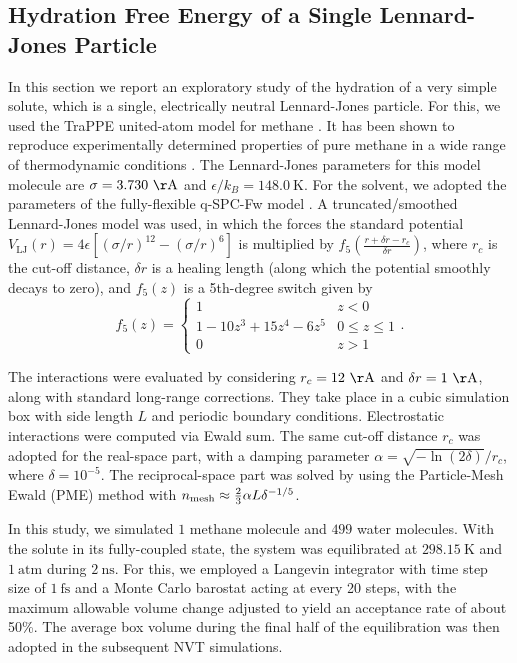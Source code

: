 \documentclass[
aip,
jcp,
reprint,
]{revtex4-1}
\begin{document}
\subsection{Hydration Free Energy of a Single Lennard-Jones Particle}
\label{sec:hydration free energy}

In this section we report an exploratory study of the hydration of a very simple solute, which is a single, electrically neutral Lennard-Jones particle.
For this, we used the TraPPE united-atom model for methane \cite{Siepmann_1998}.
It has been shown to reproduce experimentally determined properties of pure methane in a wide range of thermodynamic conditions \cite{Aimoli_2014}.
The Lennard-Jones parameters for this model molecule are $\sigma = 3.730~\mathrm{\AA}$ and $\epsilon/k_B = 148.0~\mathrm{K}$.
For the solvent, we adopted the parameters of the fully-flexible q-SPC-Fw model \cite{Paesani_2006}.
A truncated/smoothed Lennard-Jones model was used, in which the forces the standard potential $V_\mathrm{LJ}(r) = 4\epsilon[(\sigma/r)^{12}-(\sigma/r)^6]$ is multiplied by $f_5(\frac{r+\delta r-r_c}{\delta r})$, where $r_c$ is the cut-off distance, $\delta r$ is a healing length (along which the potential smoothly decays to zero), and $f_5(z)$ is a 5th-degree switch given by
\begin{equation}
\label{eq:swithing function}
f_5(z) = \begin{cases}
1 & z < 0 \\
1 - 10 z^3 + 15 z^4 - 6 z^5 & 0 \leq z \leq 1 \\
0 & z > 1
\end{cases}.
\end{equation}

The interactions were evaluated by considering $r_c = 12~\mathrm{\AA}$ and $\delta r = 1~\mathrm{\AA}$, along with standard long-range corrections.
They take place in a cubic simulation box with side length $L$ and periodic boundary conditions.
Electrostatic interactions were computed via Ewald sum.
The same cut-off distance $r_c$ was adopted for the real-space part, with a damping parameter $\alpha = {\sqrt{-\ln(2\delta)}}/{r_c}$, where $\delta = 10^{-5}$.
The reciprocal-space part was solved by using the Particle-Mesh Ewald (PME) method \cite{Darden_1993} with $n_{\rm mesh} \approx \frac{2}{3} \alpha L \delta^{-1/5}$.

In this study, we simulated $1$ methane molecule and $499$ water molecules.
With the solute in its fully-coupled state, the system was equilibrated at $298.15~\mathrm{K}$ and $1~\mathrm{atm}$ during $2~\mathrm{ns}$.
For this, we employed a Langevin integrator with time step size of $1~\mathrm{fs}$ and a Monte Carlo barostat \cite{Chow_1995, Aqvist_2004} acting at every 20 steps, with the maximum allowable volume change adjusted to yield an acceptance rate of about 50\%.
The average box volume during the final half of the equilibration was then adopted in the subsequent NVT simulations.
\end{document}
